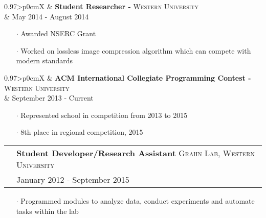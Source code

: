 \documentclass[letterpaper, oneside, final]{scrartcl} %
\newcommand{\gray}{\rowcolor[gray]{.90}} %
\begin{document}
\begin{center}
\vspace{-0.05cm}

\begin{tabularx}{0.97\linewidth}{>{\raggedleft\scshape}p{0cm}X}
\gray & \textbf{Student Researcher -} \textsc{Western University}\\
\gray & {May 2014 - August 2014}\\
\end{tabularx}
\vspace{-0.1cm}
\begin{itemize}\itemsep-0.2cm
\item[$\cdot$] Awarded NSERC Grant
\item[$\cdot$] Worked on lossless image compression algorithm which can compete with modern standards\\
\end{itemize}

\vspace{-0.05cm}

\begin{tabularx}{0.97\linewidth}{>{\raggedleft\scshape}p{0cm}X}
\gray & \textbf{ACM International Collegiate Programming Contest -} \textsc{Western University}\\
\gray & {September 2013 - Current}\	\
\end{tabularx}
\vspace{-0.1cm}
\begin{itemize} \itemsep-0.2cm
\item[$\cdot$] Represented school in competition from 2013 to 2015
\item[$\cdot$] 8th place in regional competition, 2015 \\
\end{itemize}


\vspace{-0.05cm}

\begin{tabularx}{0.97\linewidth}{>{\raggedleft\scshape}p{0cm}X}
\gray & \textbf{Student Developer/Research Assistant} \textsc{Grahn Lab, Western University}\\
\gray & {January 2012 - September 2015}\\
\end{tabularx}
\vspace{-0.1cm}
\begin{itemize} \itemsep-0.2cm
\item[$\cdot$] Programmed modules to analyze data, conduct experiments and automate tasks within the lab

\end{itemize}


\end{center}
\end{document}
